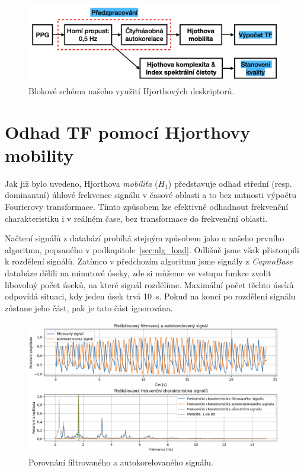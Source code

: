 \begin{figure}[h]
	\centering
	\includegraphics[width=1\textwidth]{./obrazky/hjorth_schema.png} %
	\caption[Schéma našeho algorimu, který využívá Hjorthových deskriptorů]{Blokové schéma našeho využití Hjorthových deskriptorů.}
	\label{fig:hjorth_schemata}
\end{figure}

\section{Odhad TF pomocí Hjorthovy mobility}
\label{sec:hjorth_mobilita_tf}
Jak již bylo uvedeno, Hjorthova \textit{mobilita} (\( H_1 \)) představuje odhad střední (resp. dominantní) úhlové frekvence signálu v časové oblasti a to bez nutnosti výpočtu Fourierovy transformace.
Tímto způsobem lze efektivně odhadnout frekvenční charakteristiku i v reálném čase, bez transformace do frekvenční oblasti.

Načtení signálů z databází probíhá stejným způsobem jako u našeho prvního algoritmu, popsaného v podkapitole~\ref{sec:alg_load}.
Odlišně jsme však přistoupili k rozdělení signálů.
Zatímco v předchozím algoritmu jsme signály z \textit{CapnoBase} databáze dělili na minutové úseky, zde si můžeme ve vstupu funkce zvolit libovolný počet úseků, na které signál rozdělíme.
Maximální počet těchto úseků odpovídá situaci, kdy jeden úsek trvá 10~s.
Pokud na konci po rozdělení signálu zůstane jeho část, pak je tato část ignorována.

\begin{figure}[t]
	\centering
	\includegraphics[width=1\textwidth]{./obrazky/hjorth_autocorr_freq.png}
	\caption[Porovnání filtrovaného a autokorelovaného signálu]{Porovnání filtrovaného a autokorelovaného signálu.}
	\label{fig:hjorth_autocorr}
\end{figure}

